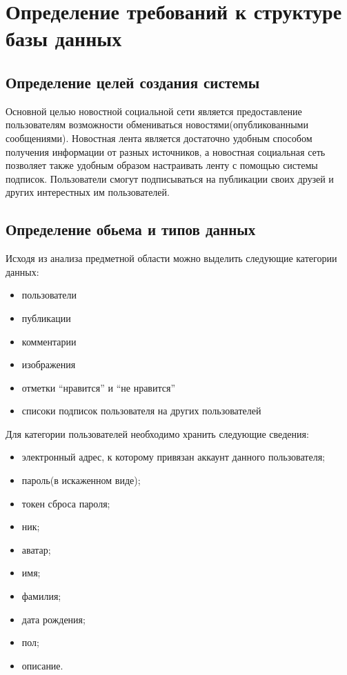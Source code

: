 \section{Определение требований к структуре базы данных}

\subsection{Определение целей создания системы}

Основной целью новостной социальной сети является предоставление пользователям
возможности обмениваться новостями(опубликованными сообщениями).
Новостная лента является достаточно удобным способом получения информации
от разных источников,
а новостная социальная сеть позволяет также удобным образом настраивать
ленту с помощью системы подписок.
Пользователи смогут подписываться на публикации своих друзей и других интерестных
им пользователей. 

\subsection{Определение обьема и типов данных}

Исходя из анализа предметной области можно выделить следующие категории данных:
\begin{itemize}
\item пользователи
\item публикации
\item комментарии
\item изображения
\item отметки ``нравится'' и ``не нравится''
\item списоки подписок пользователя на других пользователей
\end{itemize}

Для категории пользователей необходимо хранить следующие сведения:
\begin{itemize}
\item электронный адрес, к которому привязан аккаунт данного пользователя;
\item пароль(в искаженном виде);
\item токен сброса пароля;
\item ник;
\item аватар;
\item имя;
\item фамилия;
\item дата рождения;
\item пол;
\item описание.
\end{itemize}


